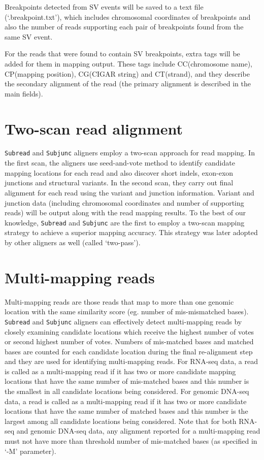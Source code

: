 \documentclass[12pt]{report}
\newcommand{\code}[1]{{\small\texttt{#1}}}
\begin{document}
Breakpoints detected from SV events will be saved to a text file (`.breakpoint.txt'), which includes chromosomal coordinates of breakpoints and also the number of reads supporting each pair of breakpoints found from the same SV event.

For the reads that were found to contain SV breakpoints, extra tags will be added for them in mapping output.
These tags include CC(chromosome name), CP(mapping position), CG(CIGAR string) and CT(strand), and they describe the secondary alignment of the read (the primary alignment is described in the main fields).


\section{Two-scan read alignment}

\code{Subread} and \code{Subjunc} aligners employ a two-scan approach for read mapping.
In the first scan, the aligners use seed-and-vote method to identify candidate mapping locations for each read and also discover short indels, exon-exon junctions and structural variants.
In the second scan, they carry out final alignment for each read using the variant and junction information.
Variant and junction data (including chromosomal coordinates and number of supporting reads) will be output along with the read mapping results.
To the best of our knowledge, \code{Subread} and \code{Subjunc} are the first to employ a two-scan mapping strategy to achieve a superior mapping accuracy.
This strategy was later adopted by other aligners as well (called `two-pass').


\section{Multi-mapping reads}

Multi-mapping reads are those reads that map to more than one genomic location with the same similarity score (eg. number of mis-mismatched bases).
\code{Subread} and \code{Subjunc} aligners can effectively detect multi-mapping reads by closely examining candidate locations which receive the highest number of votes or second highest number of votes.
Numbers of mis-matched bases and matched bases are counted for each candidate location during the final re-alignment step and they are used for identifying multi-mapping reads.
For RNA-seq data, a read is called as a multi-mapping read if it has two or more candidate mapping locations that have the same number of mis-matched bases and this number is the smallest in all candidate locations being considered.
For genomic DNA-seq data, a read is called as a multi-mapping read if it has two or more candidate locations that have the same number of matched bases and this number is the largest among all candidate locations being considered.
Note that for both RNA-seq and genomic DNA-seq data, any alignment reported for a multi-mapping read must not have more than threshold number of mis-matched bases (as specified in `-M' parameter).
\end{document}
